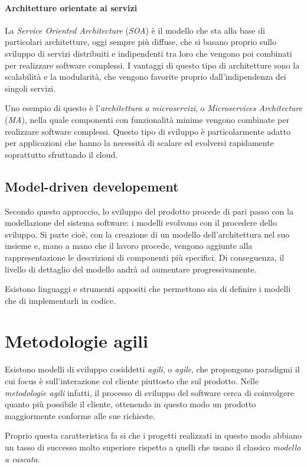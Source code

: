 \documentclass[12pt, a4paper]{report}
\theoremstyle{def}
\theoremstyle{definition}
\begin{document}
\paragraph{Architetture orientate ai servizi}
La \emph{Service Oriented Architecture} (\emph{SOA}) è il modello che sta alla
base di particolari architetture, oggi sempre più diffuse, che si basano proprio
sullo sviluppo di servizi distribuiti e indipendenti tra loro che vengono poi
combinati per realizzare software complessi. I vantaggi di questo tipo di
architetture sono la scalabilità e la modularità, che vengono favorite proprio
dall'indipendenza dei singoli servizi.

Uno esempio di questo è l'\emph{architettura a microservizi}, o \emph{Microservices
Architecture} (\emph{MA}), nella quale componenti con funzionalità minime
vengono combinate per realizzare software complessi. Questo tipo di sviluppo è
particolarmente adatto per applicazioni che hanno la necessità di scalare ed
evolversi rapidamente soprattutto sfruttando il cloud.

\subsection{Model-driven developement}
Secondo questo approccio, lo sviluppo del prodotto procede di pari passo con la
modellazione del sistema software: i modelli evolvono con il procedere dello
sviluppo. Si parte cioè, con la creazione di un modello dell'architettura nel
suo insieme e, mano a mano che il lavoro procede, vengono aggiunte alla
rappresentazione le descrizioni di componenti più specifici. Di conseguenza, il
livello di dettaglio del modello andrà ad aumentare progressivamente.

Esistono linguaggi e strumenti appositi che permettono sia di definire i
modelli che di implementarli in codice.

\section{Metodologie agili}
Esistono modelli di sviluppo cosiddetti \emph{agili}, o \emph{agile}, che propongono
paradigmi il cui focus è sull'interazione col cliente piuttosto che sul prodotto.
Nelle \emph{metodologie agili} infatti, il processo di sviluppo del software
cerca di coinvolgere quanto più possibile il cliente, ottenendo in questo modo
un prodotto maggiormente conforme alle sue richieste.

Proprio questa caratteristica fa si che i progetti realizzati in questo modo
abbiano un tasso di successo molto superiore rispetto a quelli che usano il
classico \emph{modello a cascata}.
\end{document}
